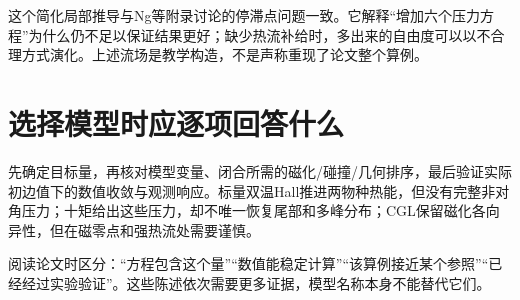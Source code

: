 这个简化局部推导与Ng等附录讨论的停滞点问题一致。它解释“增加六个压力方程”为什么仍不足以保证结果更好；缺少热流补给时，多出来的自由度可以以不合理方式演化。上述流场是教学构造，不是声称重现了论文整个算例。\citep{Ng2020}

\section{选择模型时应逐项回答什么}
先确定目标量，再核对模型变量、闭合所需的磁化/碰撞/几何排序，最后验证实际初边值下的数值收敛与观测响应。标量双温Hall推进两物种热能，但没有完整非对角压力；十矩给出这些压力，却不唯一恢复尾部和多峰分布；CGL保留磁化各向异性，但在磁零点和强热流处需要谨慎。

阅读论文时区分：“方程包含这个量”“数值能稳定计算”“该算例接近某个参照”“已经经过实验验证”。这些陈述依次需要更多证据，模型名称本身不能替代它们。
